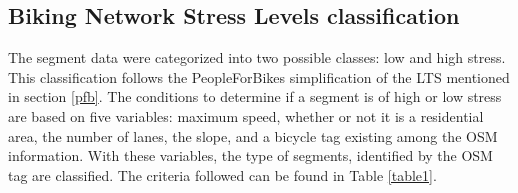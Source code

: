\documentclass[information,article,submit,moreauthors,pdftex,10pt,a4paper]{mdpi}
\theoremstyle{mdpi}
\newcounter{ex}
\newcounter{re}
\theoremstyle{mdpidefinition}
\begin{document}
\subsection{Biking Network Stress Levels classification} \label{classification}

The segment data were categorized into two possible classes: low and high stress. This classification follows the PeopleForBikes simplification of the LTS mentioned in section \ref{pfb}. The conditions to determine if a segment is of high or low stress are based on five variables: maximum speed, whether or not it is a residential area, the number of lanes, the slope, and a bicycle tag existing among the OSM information. With these variables, the type of segments, identified by the OSM tag are classified. The criteria followed can be found in Table \ref{table1}.
\end{document}
